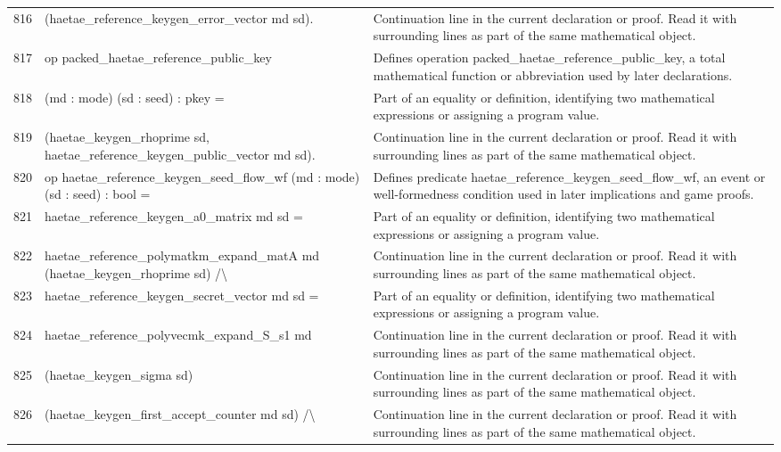 \documentclass[10pt]{article}
\begin{document}
\begin{longtable}{r L{0.53\textwidth} L{0.37\textwidth}}
816 & {\ttfamily\scriptsize     (haetae\_reference\_keygen\_error\_vector md sd).} & Continuation line in the current declaration or proof.  Read it with surrounding lines as part of the same mathematical object. \\
817 & {\ttfamily\scriptsize op packed\_haetae\_reference\_public\_key} & Defines operation packed\_haetae\_reference\_public\_key, a total mathematical function or abbreviation used by later declarations. \\
818 & {\ttfamily\scriptsize    (md : mode) (sd : seed) : pkey =} & Part of an equality or definition, identifying two mathematical expressions or assigning a program value. \\
819 & {\ttfamily\scriptsize   (haetae\_keygen\_rhoprime sd, haetae\_reference\_keygen\_public\_vector md sd).} & Continuation line in the current declaration or proof.  Read it with surrounding lines as part of the same mathematical object. \\
820 & {\ttfamily\scriptsize op haetae\_reference\_keygen\_seed\_flow\_wf (md : mode) (sd : seed) : bool =} & Defines predicate haetae\_reference\_keygen\_seed\_flow\_wf, an event or well-formedness condition used in later implications and game proofs. \\
821 & {\ttfamily\scriptsize   haetae\_reference\_keygen\_a0\_matrix md sd =} & Part of an equality or definition, identifying two mathematical expressions or assigning a program value. \\
822 & {\ttfamily\scriptsize     haetae\_reference\_polymatkm\_expand\_matA md (haetae\_keygen\_rhoprime sd) /\textbackslash{}} & Continuation line in the current declaration or proof.  Read it with surrounding lines as part of the same mathematical object. \\
823 & {\ttfamily\scriptsize   haetae\_reference\_keygen\_secret\_vector md sd =} & Part of an equality or definition, identifying two mathematical expressions or assigning a program value. \\
824 & {\ttfamily\scriptsize     haetae\_reference\_polyvecmk\_expand\_S\_s1 md} & Continuation line in the current declaration or proof.  Read it with surrounding lines as part of the same mathematical object. \\
825 & {\ttfamily\scriptsize       (haetae\_keygen\_sigma sd)} & Continuation line in the current declaration or proof.  Read it with surrounding lines as part of the same mathematical object. \\
826 & {\ttfamily\scriptsize       (haetae\_keygen\_first\_accept\_counter md sd) /\textbackslash{}} & Continuation line in the current declaration or proof.  Read it with surrounding lines as part of the same mathematical object. \\

\end{longtable}
\end{document}
